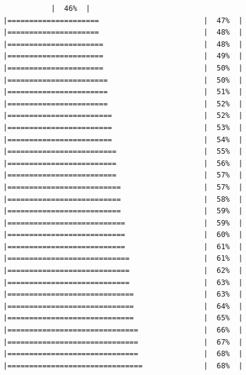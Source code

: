 \documentclass[
  krantz2]{krantz}
\begin{document}
\begin{verbatim}
           |  46%  |                                                     |=====================                        |  47%  |                                                     |=====================                        |  48%  |                                                     |======================                       |  48%  |                                                     |======================                       |  49%  |                                                     |======================                       |  50%  |                                                     |=======================                      |  50%  |                                                     |=======================                      |  51%  |                                                     |=======================                      |  52%  |                                                     |========================                     |  52%  |                                                     |========================                     |  53%  |                                                     |========================                     |  54%  |                                                     |=========================                    |  55%  |                                                     |=========================                    |  56%  |                                                     |=========================                    |  57%  |                                                     |==========================                   |  57%  |                                                     |==========================                   |  58%  |                                                     |==========================                   |  59%  |                                                     |===========================                  |  59%  |                                                     |===========================                  |  60%  |                                                     |===========================                  |  61%  |                                                     |============================                 |  61%  |                                                     |============================                 |  62%  |                                                     |============================                 |  63%  |                                                     |=============================                |  63%  |                                                     |=============================                |  64%  |                                                     |=============================                |  65%  |                                                     |==============================               |  66%  |                                                     |==============================               |  67%  |                                                     |==============================               |  68%  |                                                     |===============================              |  68%  |                                                     
\end{verbatim}
\end{document}
